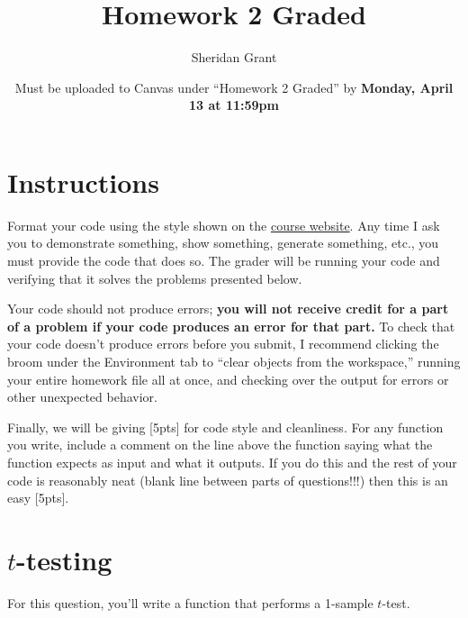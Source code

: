 \documentclass[12pt]{article}
\title{Homework 2 Graded}
\author{Sheridan Grant}
\date{Must be uploaded to Canvas under ``Homework 2 Graded'' by \textbf{Monday, April 13 at 11:59pm}}
\begin{document}
\sloppy

\maketitle

\section*{Instructions}

Format your code using the style shown on the \href{https://sheridanlgrant.github.io/teaching/STAT302_SPR2020}{course website}. Any time I ask you to demonstrate something, show something, generate something, etc., you must provide the code that does so. The grader will be running your code and verifying that it solves the problems presented below.

Your code should not produce errors; \textbf{you will not receive credit for a part of a problem if your code produces an error for that part.} To check that your code doesn't produce errors before you submit, I recommend clicking the broom under the Environment tab to ``clear objects from the workspace,'' running your entire homework file all at once, and checking over the output for errors or other unexpected behavior.

Finally, we will be giving [5pts] for code style and cleanliness. For any function you write, include a comment on the line above the function saying what the function expects as input and what it outputs. If you do this and the rest of your code is reasonably neat (blank line between parts of questions!!!) then this is an easy [5pts].

\section{$t$-testing}

For this question, you'll write a function that performs a 1-sample $t$-test.
\end{document}
